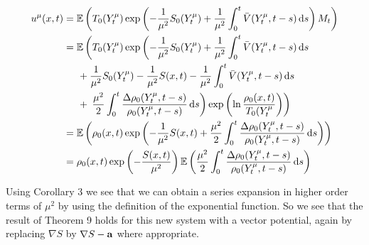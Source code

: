 \documentclass[a4paper,12pt,draft]{report}
\theoremstyle{remark}
\theoremstyle{definition}
\begin{document}
{\begin{align}
u^\mu(x, t) & = \mathbb{E}\left(T_0(Y_t^\mu)\exp\left(-\frac{1}{\mu^2}S_0(Y_t^\mu) + \frac{1}{\mu^2}\int_0^t\bar{V}(Y_t^\mu, t - s)\,\mathrm{d}s\right)M_t\right)\nonumber\\
& = \mathbb{E}\left(T_0(Y_t^\mu)\exp\left(-\frac{1}{\mu^2}S_0(Y_t^\mu) + \frac{1}{\mu^2}\int_0^t\bar{V}(Y_t^\mu, t - s)\,\mathrm{d}s\right.\right.\nonumber\\
& \hspace{0.5cm} + \frac{1}{\mu^2}S_0(Y_t^\mu) - \frac{1}{\mu^2}S(x, t) - \frac{1}{\mu^2}\int_0^t\bar{V}(Y_t^\mu, t - s)\,\mathrm{d}s\nonumber\\
& \hspace{0.5cm} + \left.\left.\frac{\mu^2}{2}\int_0^t\frac{\Delta\rho_0(Y_t^\mu, t - s)}{\rho_0(Y_t^\mu, t - s)}\,\mathrm{d}s\right)\exp\left(\ln\frac{\rho_0(x, t)}{T_0(Y_t^\mu}\right)\right)\nonumber\\
& = \mathbb{E}\left(\rho_0(x, t)\exp\left(-\frac{1}{\mu^2}S(x, t) + \frac{\mu^2}{2}\int_0^t\frac{\Delta\rho_0(Y_t^\mu, t - s)}{\rho_0(Y_t^\mu, t - s)}\,\mathrm{d}s\right)\right)\nonumber\\
& = \rho_0(x, t)\exp\left(-\frac{S(x, t)}{\mu^2}\right)\mathbb{E}\left(\frac{\mu^2}{2}\int_0^t\frac{\Delta\rho_0(Y_t^\mu, t - s)}{\rho_0(Y_t^\mu, t - s)}\,\mathrm{d}s\right)\nonumber
\end{align}

\qedhere
}

Using Corollary 3 we see that we can obtain a series expansion in higher order terms of $\mu^2$ by using the definition of the exponential function.  So we see that the result of Theorem 9 holds for this new system with a vector potential, again by replacing $\nabla S$ by $\nabla S - \bold{a}$ where appropriate.
\end{document}
